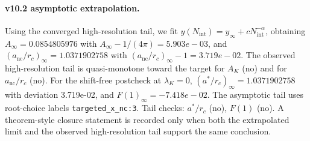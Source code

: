 \paragraph{v10.2 asymptotic extrapolation.}
Using the converged high-resolution tail, we fit $y(N_{\mathrm{int}})=y_{\infty}+cN_{\mathrm{int}}^{-\alpha}$, obtaining $A_\infty=0.0854805976$ with $A_\infty-1/(4\pi)=5.903e-03$, and $(a_{\mathrm{nc}}/r_c)_\infty=1.0371902758$ with $(a_{\mathrm{nc}}/r_c)_\infty-1=3.719e-02$. The observed high-resolution tail is quasi-monotone toward the target for $A_K$ (no) and for $a_{\mathrm{nc}}/r_c$ (no). For the shift-free postcheck at $\lambda_K=0$, $(a^*/r_c)_\infty=1.0371902758$ with deviation 3.719e-02, and $F(1)_\infty=-7.418e-02$. The asymptotic tail uses root-choice labels \texttt{targeted_x_nc:3}. Tail checks: $a^*/r_c$ (no), $F(1)$ (no). A theorem-style closure statement is recorded only when both the extrapolated limit and the
observed high-resolution tail support the same conclusion.

